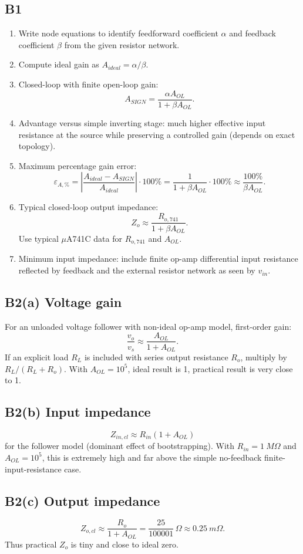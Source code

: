 \documentclass[12pt,a4paper]{article}
\begin{document}
\subsection{B1}
\begin{enumerate}
\item Write node equations to identify feedforward coefficient $\alpha$ and feedback coefficient $\beta$ from the given resistor network.
\item Compute ideal gain as $A_{ideal}=\alpha/\beta$.
\item Closed-loop with finite open-loop gain: 
\[
A_{SIGN}=\frac{\alpha A_{OL}}{1+\beta A_{OL}}.
\]
\item Advantage versus simple inverting stage: much higher effective input resistance at the source while preserving a controlled gain (depends on exact topology).
\item Maximum percentage gain error:
\[
\varepsilon_{A,\%}=\left|\frac{A_{ideal}-A_{SIGN}}{A_{ideal}}\right|\cdot100\%
=\frac{1}{1+\beta A_{OL}}\cdot100\% \approx \frac{100\%}{\beta A_{OL}}.
\]
\item Typical closed-loop output impedance:
\[
Z_o\approx \frac{R_{o,741}}{1+\beta A_{OL}}.
\]
Use typical \(\mu\)A741C data for $R_{o,741}$ and $A_{OL}$.
\item Minimum input impedance: include finite op-amp differential input resistance reflected by feedback and the external resistor network as seen by $v_{in}$.
\end{enumerate}

\subsection{B2(a) Voltage gain}
For an unloaded voltage follower with non-ideal op-amp model, first-order gain:
\[
\frac{v_o}{v_s}\approx\frac{A_{OL}}{1+A_{OL}}.
\]
If an explicit load $R_L$ is included with series output resistance $R_o$, multiply by $R_L/(R_L+R_o)$.
With $A_{OL}=10^5$, ideal result is 1, practical result is very close to 1.

\subsection{B2(b) Input impedance}
\[
Z_{in,cl}\approx R_{in}(1+A_{OL})
\]
for the follower model (dominant effect of bootstrapping). With $R_{in}=\SI{1}{M\Omega}$ and $A_{OL}=10^5$, this is extremely high and far above the simple no-feedback finite-input-resistance case.

\subsection{B2(c) Output impedance}
\[
Z_{o,cl}\approx \frac{R_o}{1+A_{OL}}=\frac{25}{100001}\,\Omega\approx\SI{0.25}{m\Omega}.
\]
Thus practical $Z_o$ is tiny and close to ideal zero.
\end{document}

